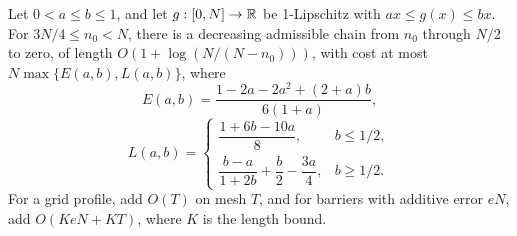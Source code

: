 \begin{lemma}\label{fprof:split}
Let \(0<a\le b\le1\), and let \(g:[0,N]\to\mathbb R\) be 1-Lipschitz with
\(ax\le g(x)\le bx\). For \(3N/4\le n_0<N\), there is a decreasing admissible
chain from \(n_0\) through \(N/2\) to zero, of length
\(O(1+\log(N/(N-n_0)))\), with cost at most \(N\max\{E(a,b),L(a,b)\}\), where
$$
 E(a,b)=\frac{1-2a-2a^2+(2+a)b}{6(1+a)},
$$
$$
 L(a,b)=\begin{cases}
 \dfrac{1+6b-10a}{8},&b\le1/2,\\[5pt]
 \dfrac{b-a}{1+2b}+\dfrac b2-\dfrac{3a}{4},&b\ge1/2.
 \end{cases}
$$
For a grid profile, add \(O(T)\) on mesh \(T\), and for barriers with additive
error \(eN\), add \(O(KeN+KT)\), where \(K\) is the length bound.
\end{lemma}
